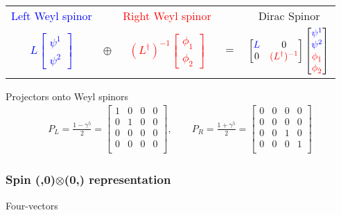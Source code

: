 \documentclass[../main.tex]{subfiles}
\begin{document}
\begin{itemize}
\begin{center}
\begin{tabular}{ccccc}
\textcolor{blue}{Left Weyl spinor} & & \textcolor{red}{Right Weyl spinor}& &Dirac Spinor\\
\textcolor{blue}{$L\left[\begin{matrix}
\psi^1 \\
\psi^2 
\end{matrix}
\right]$} & 
$\oplus$ & 
\textcolor{red}{$(L^\dagger)^{-1}\left[\begin{matrix}
\phi_{\dot{1}} \\
\phi_{\dot{2}}
\end{matrix}
\right]$} & $=$ & 
$\left[\begin{matrix}
\textcolor{blue}{L} & 0\\
0 & \textcolor{red}{(L^\dagger)^{-1}}
\end{matrix}\right]
\left[\begin{matrix}
\textcolor{blue}{\psi^1} \\
\textcolor{blue}{\psi^2} \\
\textcolor{red}{\phi_{\dot{1}}} \\
\textcolor{red}{\phi_{\dot{2}}} \\
\end{matrix}
\right]$ \\
\end{tabular}
\end{center}
Projectors onto Weyl spinors
\begin{align}
P_L=\frac{1-\gamma^5}{2}=
\left[\begin{matrix}
1 & 0 & 0 & 0\\
0 & 1 & 0 & 0\\
0 & 0 & 0 & 0\\
0 & 0 & 0 & 0\\
\end{matrix}\right],\qquad
P_R=\frac{1+\gamma^5}{2}=
\left[\begin{matrix}
0 & 0 & 0 & 0\\
0 & 0 & 0 & 0\\
0 & 0 & 1 & 0\\
0 & 0 & 0 & 1\\
\end{matrix}\right]
\end{align}

\subsubsection{Spin (,0)$\otimes$(0,) representation}
Four-vectors


\end{itemize}
\end{document}
